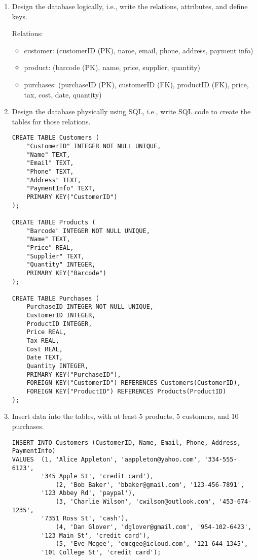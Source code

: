 \documentclass[notitlepage, 11pt]{report}
\begin{document}
\begin{enumerate}[itemindent=-1.5em]
\begin{center}
	\end{center}
	\item Design the database logically, i.e., write the relations, attributes, and define keys.
	
	Relations:
	\begin{itemize}
		\item customer: (customerID (PK), name, email, phone, address, payment info)
		\item product: (barcode (PK), name, price, supplier, quantity)
		\item purchases: (purchaseID (PK), customerID (FK), productID (FK), price, tax, cost, date, quantity)
	\end{itemize}
\newpage
	\item Design the database physically using SQL, i.e., write SQL code to create the tables for those relations.
\Suppressnumber
\begin{lstlisting}
CREATE TABLE Customers (
	"CustomerID" INTEGER NOT NULL UNIQUE,
	"Name" TEXT,
	"Email" TEXT,
	"Phone" TEXT,
	"Address" TEXT,
	"PaymentInfo" TEXT,
	PRIMARY KEY("CustomerID")
);

CREATE TABLE Products (
	"Barcode" INTEGER NOT NULL UNIQUE,
	"Name" TEXT,
	"Price" REAL,
	"Supplier" TEXT,
	"Quantity" INTEGER,
	PRIMARY KEY("Barcode")
);

CREATE TABLE Purchases (
	PurchaseID INTEGER NOT NULL UNIQUE,
	CustomerID INTEGER,
	ProductID INTEGER,
	Price REAL,
	Tax REAL,
	Cost REAL,
	Date TEXT,
	Quantity INTEGER,
	PRIMARY KEY("PurchaseID"),
	FOREIGN KEY("CustomerID") REFERENCES Customers(CustomerID),
	FOREIGN KEY("ProductID") REFERENCES Products(ProductID)
);

\end{lstlisting}
	\item Insert data into the tables, with at least 5 products, 5 customers, and 10 purchases.
\begin{lstlisting}
INSERT INTO Customers (CustomerID, Name, Email, Phone, Address, PaymentInfo)
VALUES	(1, 'Alice Appleton', 'aappleton@yahoo.com', '334-555-6123', 
		'345 Apple St', 'credit card'),
			(2, 'Bob Baker', 'bbaker@gmail.com', '123-456-7891', 
		'123 Abbey Rd', 'paypal'),
			(3, 'Charlie Wilson', 'cwilson@outlook.com', '453-674-1235', 
		'7351 Ross St', 'cash'),
			(4, 'Dan Glover', 'dglover@gmail.com', '954-102-6423', 
		'123 Main St', 'credit card'),
			(5, 'Eve Mcgee', 'emcgee@icloud.com', '121-644-1345', 
		'101 College St', 'credit card');


\end{lstlisting}
\end{enumerate}
\end{document}
